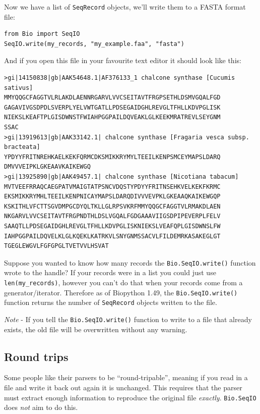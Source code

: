 \documentclass{report}
\begin{document}
\noindent Now we have a list of \verb|SeqRecord| objects, we'll write them to a FASTA format file:

\begin{verbatim}
from Bio import SeqIO
SeqIO.write(my_records, "my_example.faa", "fasta")
\end{verbatim}

\noindent And if you open this file in your favourite text editor it should look like this:

\begin{verbatim}
>gi|14150838|gb|AAK54648.1|AF376133_1 chalcone synthase [Cucumis sativus]
MMYQQGCFAGGTVLRLAKDLAENNRGARVLVVCSEITAVTFRGPSETHLDSMVGQALFGD
GAGAVIVGSDPDLSVERPLYELVWTGATLLPDSEGAIDGHLREVGLTFHLLKDVPGLISK
NIEKSLKEAFTPLGISDWNSTFWIAHPGGPAILDQVEAKLGLKEEKMRATREVLSEYGNM
SSAC
>gi|13919613|gb|AAK33142.1| chalcone synthase [Fragaria vesca subsp. bracteata]
YPDYYFRITNREHKAELKEKFQRMCDKSMIKKRYMYLTEEILKENPSMCEYMAPSLDARQ
DMVVVEIPKLGKEAAVKAIKEWGQ
>gi|13925890|gb|AAK49457.1| chalcone synthase [Nicotiana tabacum]
MVTVEEFRRAQCAEGPATVMAIGTATPSNCVDQSTYPDYYFRITNSEHKVELKEKFKRMC
EKSMIKKRYMHLTEEILKENPNICAYMAPSLDARQDIVVVEVPKLGKEAAQKAIKEWGQP
KSKITHLVFCTTSGVDMPGCDYQLTKLLGLRPSVKRFMMYQQGCFAGGTVLRMAKDLAEN
NKGARVLVVCSEITAVTFRGPNDTHLDSLVGQALFGDGAAAVIIGSDPIPEVERPLFELV
SAAQTLLPDSEGAIDGHLREVGLTFHLLKDVPGLISKNIEKSLVEAFQPLGISDWNSLFW
IAHPGGPAILDQVELKLGLKQEKLKATRKVLSNYGNMSSACVLFILDEMRKASAKEGLGT
TGEGLEWGVLFGFGPGLTVETVVLHSVAT
\end{verbatim}

Suppose you wanted to know how many records the \verb|Bio.SeqIO.write()| function wrote to the handle?
If your records were in a list you could just use \verb|len(my_records)|, however you can't do that when your records come from a generator/iterator.  Therefore as of Biopython 1.49, the \verb|Bio.SeqIO.write()| function returns the number of \verb|SeqRecord| objects written to the file.   

\emph{Note} - If you tell the \verb|Bio.SeqIO.write()| function to write to a file that already exists, the old file will be overwritten without any warning.

\subsection{Round trips}

Some people like their parsers to be ``round-tripable'', meaning if you read in
a file and write it back out again it is unchanged. This requires that the parser
must extract enough information to reproduce the original file \emph{exactly}.
\verb|Bio.SeqIO| does \emph{not} aim to do this.
\end{document}
